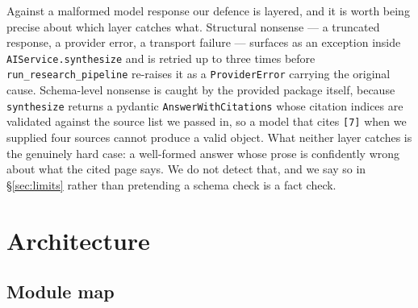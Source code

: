 \documentclass[11pt,a4paper]{article}
\begin{document}
Against a malformed model response our defence is layered, and it is worth being precise about
which layer catches what. Structural nonsense --- a truncated response, a provider error, a
transport failure --- surfaces as an exception inside \texttt{AIService.synthesize} and is
retried up to three times before \texttt{run\_research\_pipeline} re-raises it as a
\texttt{ProviderError} carrying the original cause. Schema-level nonsense is caught by the
provided package itself, because \texttt{synthesize} returns a pydantic
\texttt{AnswerWithCitations} whose citation indices are validated against the source list we
passed in, so a model that cites \texttt{[7]} when we supplied four sources cannot produce a
valid object. What neither layer catches is the genuinely hard case: a well-formed answer whose
prose is confidently wrong about what the cited page says. We do not detect that, and we say so
in \S\ref{sec:limits} rather than pretending a schema check is a fact check.

\section{Architecture}\label{sec:arch}

\subsection{Module map}
\end{document}
